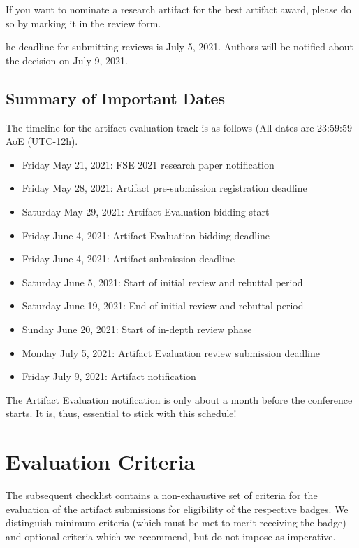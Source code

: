 \documentclass[twoside,a4paper]{refart}
\newcommand{\deadline}[1]{\attention[\faCalendar]{#1}}
\begin{document}
 If you want to nominate a research artifact
for the best artifact award, please do so by marking it in the review
form.

\deadline The deadline for submitting reviews is July 5, 2021.
Authors will be notified about the decision on July 9, 2021.

\subsection{Summary of Important Dates}

The timeline for the artifact evaluation track is as follows (All
dates are 23:59:59 AoE (UTC-12h).

\begin{itemize}
\item Friday May 21, 2021: FSE 2021 research paper notification
\item Friday May 28, 2021: Artifact pre-submission registration deadline
\item Saturday May 29, 2021: Artifact Evaluation bidding start
\item Friday June 4, 2021: Artifact Evaluation bidding deadline
\item Friday June 4, 2021: Artifact submission deadline
\item Saturday June 5, 2021: Start of initial review and rebuttal period
\item Saturday June 19, 2021: End of initial review and rebuttal period
\item Sunday June 20, 2021: Start of in-depth review phase
\item Monday July 5, 2021: Artifact Evaluation review submission deadline
\item Friday July 9, 2021: Artifact notification
\end{itemize}

The Artifact Evaluation notification is only about a month before the
conference starts. It is, thus, essential to stick with this schedule!

\section{Evaluation Criteria}

The subsequent checklist contains a non-exhaustive set of criteria for
the evaluation of the artifact submissions for eligibility of the
respective badges. We distinguish minimum criteria (which must be met
to merit receiving the badge) and optional criteria which we
recommend, but do not impose as imperative.
\end{document}
